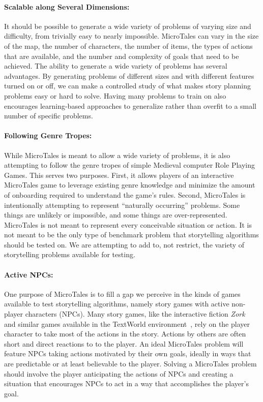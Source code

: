 \documentclass{nilreport}
\begin{document}
\paragraph{Scalable along Several Dimensions:} It should be possible to generate a wide variety of problems of varying size and difficulty, from trivially easy to nearly impossible. MicroTales can vary in the size of the map, the number of characters, the number of items, the types of actions that are available, and the number and complexity of goals that need to be achieved. The ability to generate a wide variety of problems has several advantages. By generating problems of different sizes and with different features turned on or off, we can make a controlled study of what makes story planning problems easy or hard to solve. Having many problems to train on also encourages learning-based approaches to generalize rather than overfit to a small number of specific problems.

\paragraph{Following Genre Tropes:} While MicroTales is meant to allow a wide variety of problems, it is also attempting to follow the genre tropes of simple Medieval computer Role Playing Games. This serves two purposes. First, it allows players of an interactive MicroTales game to leverage existing genre knowledge and minimize the amount of onboarding required to understand the game's rules. Second, MicroTales is intentionally attempting to represent ``naturally occurring'' problems. Some things are unlikely or impossible, and some things are over-represented. MicroTales is not meant to represent every conceivable situation or action. It is not meant to be the only type of benchmark problem that storytelling algorithms should be tested on. We are attempting to add to, not restrict, the variety of storytelling problems available for testing.

\paragraph{Active NPCs:} One purpose of MicroTales is to fill a gap we perceive in the kinds of games available to test storytelling algorithms, namely story games with active non-player characters (NPCs). Many story games, like the interactive fiction {\em Zork}~\cite{anderson1980zork} and similar games available in the TextWorld environment~\cite{cote2019textworld}, rely on the player character to take most of the actions in the story. Actions by others are often short and direct reactions to to the player. An ideal MicroTales problem will feature NPCs taking actions motivated by their own goals, ideally in ways that are predictable or at least believable to the player. Solving a MicroTales problem should involve the player anticipating the actions of NPCs and creating a situation that encourages NPCs to act in a way that accomplishes the player's goal.
\end{document}
